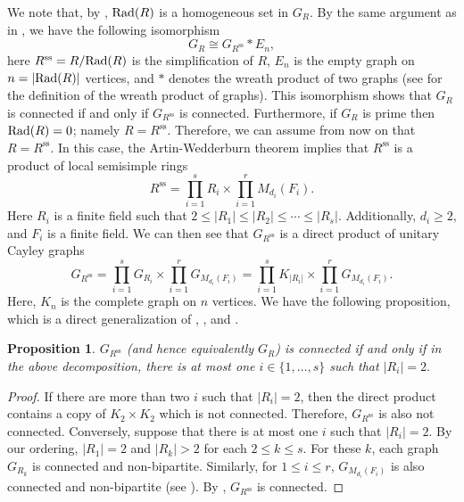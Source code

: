 \documentclass[12pt, a4paper]{amsart}
\newtheorem{prop}[thm]{Proposition}
\theoremstyle{definition}
\numberwithin{equation}{section}
\newcommand{\Rad}{{\rm Rad}}
\newcommand{\s}{\text{ss}}
\begin{document}
 We note that, by \cite[Proposition 4.30]{chudnovsky2024prime}, $\Rad(R)$ is a homogeneous set in $G_R.$ By the same argument as in \cite[Corollary 4.2]{chudnovsky2024prime}, we have the following isomorphism 
\[ G_R \cong G_{R^{\s}} * E_n, \]
here $R^{\s} = R/\Rad(R)$ is the simplification of $R$, $E_n$ is the empty graph on $n = |\Rad(R)|$ vertices, and $*$ denotes the wreath product of two graphs (see \cite[Definition 2.5]{chudnovsky2024prime} for the definition of the wreath product of graphs). This isomorphism shows that $G_{R}$ is connected if and only if $G_{R^{\s}}$ is connected. Furthermore, if $G_{R}$ is prime then $\Rad(R)=0$; namely $R=R^{\s}$. Therefore, we can assume from now on that $R=R^{\s}.$ In this case, the Artin-Wedderburn theorem implies that $R^{\s}$ is a product of local semisimple rings  
\begin{equation} \label{eq:product_rings}
R^{\s} = \prod_{i=1}^s R_i \times \prod_{i=1}^r M_{d_i}(F_i).
\end{equation}
Here $R_i$ is a finite field such that $2 \leq |R_1| \leq |R_2|\leq \cdots \leq |R_s|$. Additionally, $d_i \geq 2$, and $F_i$ is a finite field. We can then see that $G_{R^{\s}}$ is a direct product of unitary Cayley graphs 
\[ G_{R^{\s}} = \prod_{i=1}^s G_{R_i} \times \prod_{i=1}^r G_{M_{d_i}(F_i)} = \prod_{i=1}^s K_{|R_i|} \times \prod_{i=1}^r G_{M_{d_i}(F_i)}.\]
Here, $K_n$ is the complete graph on $n$ vertices.  We have the following proposition, which is a direct generalization of \cite[Lemma 4.33]{chudnovsky2024prime},   \cite[Theorem 3.6]{nguyengcd2026}, and \cite[Theorem 1.1]{maimani2010rings}.
\begin{prop} \label{prop:unitary-connected}
    $G_{R^\s}$ (and hence equivalently $G_{R}$) is  connected if and only if in the above decomposition, there is at most one $i \in \{1, \ldots, s\}$ such that $|R_i|=2.$
\end{prop}



\begin{proof}
    If there are more than two $i$ such that $|R_i|=2$, then the direct product contains a copy of $K_2 \times K_2$ which is not connected. Therefore, $G_{R^{\s}}$ is also not connected. Conversely, suppose that there is at most one $i$ such that $|R_i|=2.$ By our ordering, $|R_1|=2$ and $|R_k|>2$ for each $2 \leq k \leq s. $ For these $k$, each graph $G_{R_{k}}$ is connected and non-bipartite. Similarly, for $1 \leq i \leq r$, $G_{M_{d_i}(F_i)}$ is also connected and non-bipartite (see \cite[Proposition 3.5]{minavc2024complete}). By \cite[Corollary 5.10]{hammack2011handbook}, $G_{R^\s}$ is connected. 
\end{proof}
\end{document}
